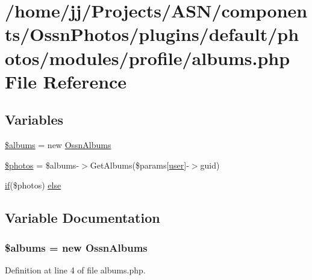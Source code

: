 \hypertarget{modules_2profile_2albums_8php}{}\section{/home/jj/\+Projects/\+A\+S\+N/components/\+Ossn\+Photos/plugins/default/photos/modules/profile/albums.php File Reference}
\label{modules_2profile_2albums_8php}
\subsection*{Variables}
\begin{DoxyCompactItemize}
\item 
\hyperlink{modules_2profile_2albums_8php_a23e8244caaacd14d608137a383e8f0e7}{\$albums} = new \hyperlink{class_ossn_albums}{Ossn\+Albums}
\item 
\hyperlink{modules_2profile_2albums_8php_a7d16539c7a3688bee1d3184c81c47487}{\$photos} = \$albums-\/$>$Get\+Albums(\$params\mbox{[}\textquotesingle{}\hyperlink{ossn_8config_8db_8example_8php_a802544b7ba9f79bbf24ef67773d53bed}{user}\textquotesingle{}\mbox{]}-\/$>$guid)
\item 
\hyperlink{jquery_8tokeninput_8js_ad8dd46a3cbc004569e34401e9e71771a}{if}(\$photos) \hyperlink{modules_2profile_2albums_8php_a939f7aa0cb33e5aaa7822448d0856acb}{else}
\end{DoxyCompactItemize}


\subsection{Variable Documentation}
\subsubsection[{\texorpdfstring{\$albums}{$albums}}]{\setlength{\rightskip}{0pt plus 5cm}\$albums = new {\bf Ossn\+Albums}}\hypertarget{modules_2profile_2albums_8php_a23e8244caaacd14d608137a383e8f0e7}{}\label{modules_2profile_2albums_8php_a23e8244caaacd14d608137a383e8f0e7}


Definition at line 4 of file albums.\+php.

